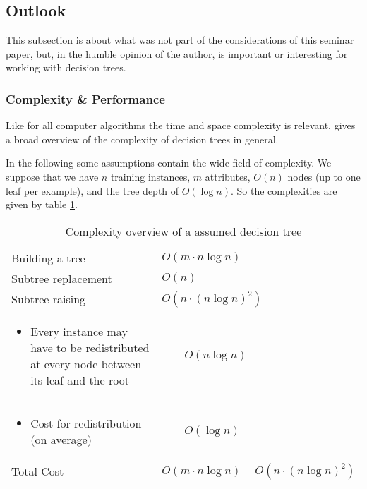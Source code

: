 \subsection{Outlook}

This subsection is about what was not part of the considerations of this seminar paper, but, in the humble opinion of the author, is important or interesting for working with decision trees.

\subsubsection{Complexity \& Performance}

Like for all computer algorithms the time and space complexity is relevant. \cite{buhrman2002complexity} gives a broad overview of the complexity of decision trees in general. 

In the following some assumptions contain the wide field of complexity. We suppose that we have $n$ training instances, $m$ attributes, $O(n)$ nodes (up to one leaf per example), and the tree depth of $O(\log n)$. So the complexities are given by table \ref{tab:complexity}. 

\begin{table}[!h] \centering
\begin{tabular}{|p{6cm} | l|} \hline
Building a tree & $O(m \cdot n \log n )$ \\
Subtree replacement & $O(n)$ \\
Subtree raising & $O\left(n \cdot (n \log n)^2 \right)$ \\ 
\vspace*{-2em} \begin{itemize}\item \small{Every instance may have to be redistributed at every node
between its leaf and the root} \vspace*{-1em} \end{itemize} & $ \qquad O\left(n \log n \right)$ \\
\vspace*{-2em} \begin{itemize}\item \small{Cost for redistribution (on average)} \vspace*{-1em} \end{itemize} & $ \qquad O\left( \log n \right)$ \\ \hline \hline
Total Cost & $O(m \cdot n \log n ) + O\left(n \cdot (n \log n)^2 \right)$ \\ \hline
\end{tabular}
\caption{Complexity overview of a assumed decision tree}
\label{tab:complexity}
\end{table}

